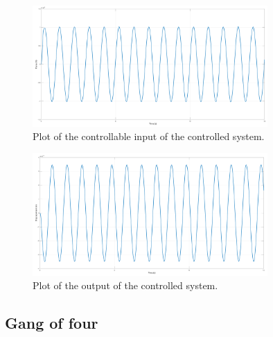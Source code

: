 \begin{figure}[H]
    \centering
    \includegraphics[width=0.8\textwidth]{resources/pdf/controllable-input.pdf}
    \caption{Plot of the controllable input of the controlled system.}
    \label{fig:controllable-input}
\end{figure}
\begin{figure}[H]
    \centering
    \includegraphics[width=0.8\textwidth]{resources/pdf/output.pdf}
    \caption{Plot of the output of the controlled system.}
    \label{fig:output}
\end{figure}

\subsection{Gang of four}
